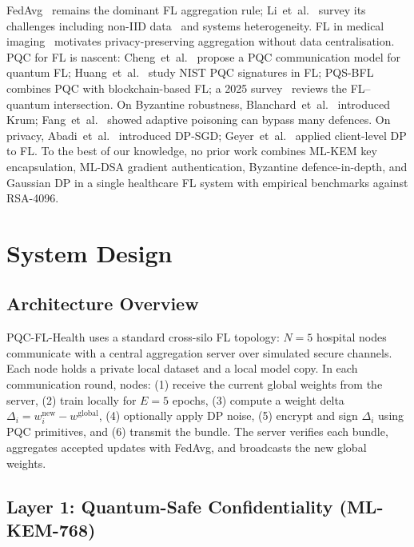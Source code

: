 \documentclass[runningheads]{llncs}
\begin{document}
FedAvg~\cite{mcmahan2017} remains the dominant FL aggregation rule;
Li~et~al.~\cite{li2020federated} survey its challenges including
non-IID data~\cite{zhao2018} and systems heterogeneity.
FL in medical imaging~\cite{rieke2020} motivates privacy-preserving
aggregation without data centralisation.
PQC for FL is nascent: Cheng~et~al.~\cite{cheng2023pqcfl} propose a
PQC communication model for quantum FL;
Huang~et~al.~\cite{huang2024pqcfl} study NIST PQC signatures in FL;
PQS-BFL~\cite{pierson2025pqsbfl} combines PQC with blockchain-based FL;
a 2025 survey~\cite{survey2025flquantum} reviews the FL--quantum
intersection.
On Byzantine robustness, Blanchard~et~al.~\cite{blanchard2017}
introduced Krum; Fang~et~al.~\cite{fang2020} showed adaptive
poisoning can bypass many defences.
On privacy, Abadi~et~al.~\cite{abadi2016} introduced DP-SGD;
Geyer~et~al.~\cite{geyer2017} applied client-level DP to FL.
To the best of our knowledge, no prior work combines ML-KEM key
encapsulation, ML-DSA gradient authentication, Byzantine
defence-in-depth, and Gaussian DP in a single healthcare FL system
with empirical benchmarks against RSA-4096.

\section{System Design}
\label{sec:system}

\subsection{Architecture Overview}

PQC-FL-Health uses a standard cross-silo FL topology: $N = 5$
hospital nodes communicate with a central aggregation server over
simulated secure channels.
Each node holds a private local dataset and a local model copy.
In each communication round, nodes: (1) receive the current global
weights from the server, (2) train locally for $E = 5$ epochs,
(3) compute a weight delta $\Delta_i = w_i^{\text{new}} - w^{\text{global}}$,
(4) optionally apply DP noise, (5) encrypt and sign $\Delta_i$ using
PQC primitives, and (6) transmit the bundle.
The server verifies each bundle, aggregates accepted updates with
FedAvg, and broadcasts the new global weights.

\subsection{Layer 1: Quantum-Safe Confidentiality (ML-KEM-768)}
\end{document}
